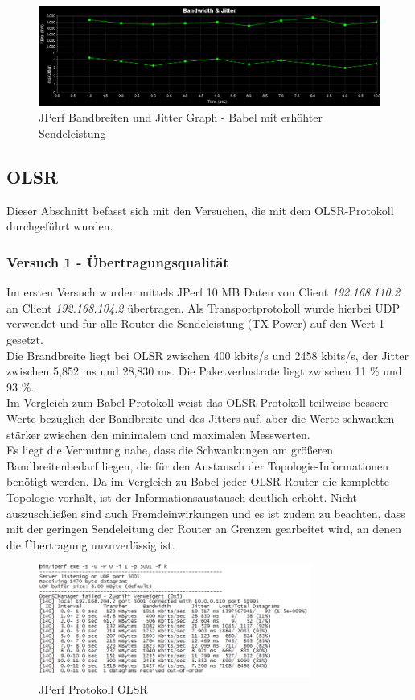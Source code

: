 \documentclass[10pt]{scrartcl}
\begin{document}
\begin{figure}[htbp]
	\centering	\includegraphics[width=1.0\textwidth]{Grafiken/Babel_TX11_Grafik.png}
	\caption{JPerf Bandbreiten und Jitter Graph - Babel mit erhöhter Sendeleistung}
	\label{fig:JPerf_Babel_Graph_TX11}
\end{figure}

\subsection{OLSR}
Dieser Abschnitt befasst sich mit den Versuchen, die mit dem OLSR-Protokoll durchgeführt wurden.

\subsubsection{Versuch 1 - Übertragungsqualität}
Im ersten Versuch wurden mittels JPerf 10 MB Daten von Client \textit{192.168.110.2} an Client \textit{192.168.104.2} übertragen. Als Transportprotokoll wurde hierbei UDP verwendet und für alle Router die Sendeleistung (TX-Power) auf den Wert 1 gesetzt. \\
Die Brandbreite liegt bei OLSR zwischen 400 kbits/s und 2458 kbits/s, der Jitter zwischen 5,852 ms und 28,830 ms. Die Paketverlustrate liegt zwischen 11 \% und 93 \%.\\
Im Vergleich zum Babel-Protokoll weist das OLSR-Protokoll teilweise bessere Werte bezüglich der Bandbreite und des Jitters auf, aber die Werte schwanken stärker zwischen den minimalem und maximalen Messwerten.\\
Es liegt die Vermutung nahe, dass die Schwankungen am größeren Bandbreitenbedarf liegen, die für den Austausch der Topologie-Informationen benötigt werden. Da im Vergleich zu Babel jeder OLSR Router die komplette Topologie vorhält, ist der Informationsaustausch deutlich erhöht. Nicht auszuschließen sind auch Fremdeinwirkungen und es ist zudem zu beachten, dass mit der geringen Sendeleitung der Router an Grenzen gearbeitet wird, an denen die Übertragung unzuverlässig ist.

\begin{figure}[htbp]
	\centering	\includegraphics[width=0.8\textwidth]{Grafiken/OLSR_TX1_Protokoll.png}
	\caption{JPerf Protokoll OLSR}
	\label{fig:JPerf_OLSR_Protokoll}
\end{figure} 
\end{document}
